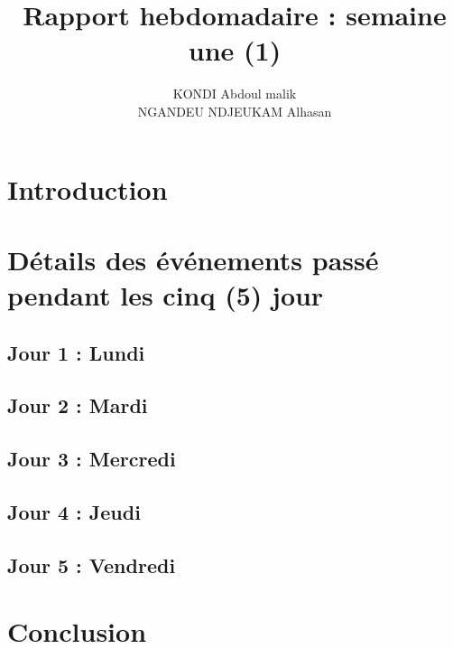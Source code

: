 \documentclass[12pt,a4paper]{article}
\author{KONDI Abdoul malik \\ NGANDEU NDJEUKAM Alhasan}
\title{Rapport hebdomadaire : semaine une (1)}
\begin{document}
\maketitle
\tableofcontents

\section{Introduction}

\section{Détails des événements passé pendant les cinq (5) jour}
\subsection{Jour 1 : Lundi}
\subsection{Jour 2 : Mardi}
\subsection{Jour 3 : Mercredi}
\subsection{Jour 4 : Jeudi}
\subsection{Jour 5 : Vendredi}

\section{Conclusion}
\end{document}
